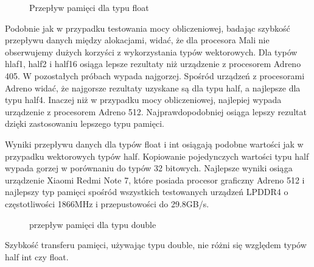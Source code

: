 \begin{figure}[H]
\caption{Przepływ pamięci dla typu float}
\end{figure}
Podobnie jak w przypadku testowania mocy obliczeniowej, badając szybkość przepływu danych między alokacjami, widać, że dla procesora Mali nie obserwujemy dużych korzyści z wykorzystania typów wektorowych. Dla typów hlaf1, half2 i half16 osiąga lepsze rezultaty niż urządzenie z procesorem Adreno 405. W pozostałych próbach wypada najgorzej. Spośród urządzeń z procesorami Adreno widać, że najgorsze rezultaty uzyskane są dla typu half, a najlepsze dla typu half4. Inaczej niż w przypadku mocy obliczeniowej, najlepiej wypada urządzenie z procesorem Adreno 512. Najprawdopodobniej osiąga lepszy rezultat dzięki zastosowaniu lepszego typu pamięci.

Wyniki przepływu danych dla typów float i int osiągają podobne wartości jak w przypadku wektorowych typów half. Kopiowanie pojedynczych wartości typu half wypada gorzej w porównaniu do typów 32 bitowych. Najlepsze wyniki osiąga urządzenie Xiaomi Redmi Note 7, które posiada procesor graficzny Adreno 512 i najlepszy typ pamięci spośród wszystkich testowanych urządzeń LPDDR4 o częstotliwości 1866MHz i przepu­stowości do 29.8GB/s.
\begin{figure}[H]
\caption{przepływ pamięci dla typu double}
\end{figure}
Szybkość transferu pamięci, używając typu double, nie różni się względem typów half int czy float.
